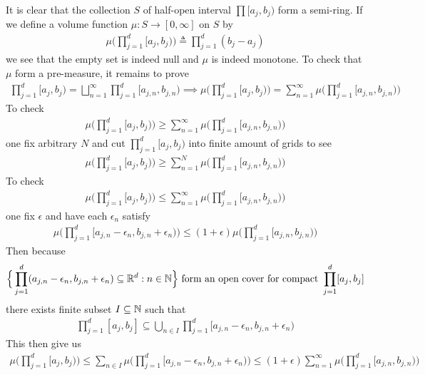 \documentclass{report}
\begin{document}
\begin{mdframed}
It is clear that the collection $S$ of half-open interval $\prod [a_j,b_j)$ form a semi-ring. If we define a volume function $\mu : S\rightarrow [0,\infty]$ on  $S$ by 
 \begin{align*}
\mu \Big( \prod_{j=1}^d [a_j,b_j) \Big)\triangleq  \prod_{j=1}^d (b_j-a_j)
\end{align*}
we see that the empty set is indeed null and $\mu$ is indeed monotone. To check that $\mu$ form a pre-measure, it remains to prove 
\begin{align*}
\prod_{j=1}^d [a_j,b_j)= \bigsqcup_{n=1}^{\infty} \prod_{j=1}^d [a_{j,n},b_{j,n}) \implies \mu \Big(\prod_{j=1}^d [a_j,b_j) \Big)= \sum_{n=1}^{\infty} \mu \Big(\prod_{j=1}^d [a_{j,n},b_{j,n}) \Big)
\end{align*}
To check 
\begin{align}
\mu \Big(\prod_{j=1}^d [a_j,b_j) \Big) \geq \sum_{n=1}^{\infty} \mu \Big(\prod_{j=1}^d [a_{j,n},b_{j,n}) \Big)
\end{align}
one fix arbitrary $N$ and cut  $\prod_{j=1}^d [a_j,b_j)$ into finite amount of grids to see  
\begin{align*}
\mu \Big(\prod_{j=1}^d [a_j,b_j) \Big) \geq \sum_{n=1}^{N} \mu \Big(\prod_{j=1}^d [a_{j,n},b_{j,n}) \Big)
\end{align*}
To check 
\begin{align*}
\label{58}
\mu \Big(\prod_{j=1}^d [a_j,b_j) \Big)\leq \sum_{n=1}^{\infty} \mu \Big(\prod _{j=1}^d [a_{j,n},b_{j,n}) \Big)
\end{align*}
one fix $\epsilon$ and have each $\epsilon _n$ satisfy 
\begin{align*}
  \mu \Big(\prod_{j=1}^d [a_{j,n}-\epsilon_n , b_{j,n}+\epsilon_n) \Big) \leq (1+\epsilon )\mu  \Big(\prod_{j=1}^d [a_{j,n},b_{j,n}) \Big)
\end{align*}
Then because  
\begin{align*}
\Big\{ \prod_{j=1}^d (a_{j,n}-\epsilon_n , b_{j,n}+\epsilon_n )\subseteq \mathbb{R}^d:n\in\mathbb{N} \Big\}\text{ form an open cover for compact }\prod_{j=1}^d [a_j,b_j]
\end{align*}
there exists finite subset $I \subseteq \mathbb{N}$ such that 
\begin{align*}
\prod_{j=1}^d [a_j,b_j]\subseteq \bigcup_{n \in I} \prod_{j=1}^d [a_{j,n}-\epsilon _n, b_{j,n}+\epsilon _n)
\end{align*}
This then give us 
\begin{align*}
\mu \Big(\prod_{j=1}^d [a_j,b_j)\Big)\leq \sum_{n \in I}\mu \Big(\prod_{j=1}^d [a_{j,n}-\epsilon _n, b_{j,n}+\epsilon _n) \Big) \leq (1+\epsilon )\sum_{n=1}^{\infty} \mu \Big(\prod_{j=1}^d [a_{j,n},b_{j,n}) \Big)

\end{align*}
\end{mdframed}
\end{document}
